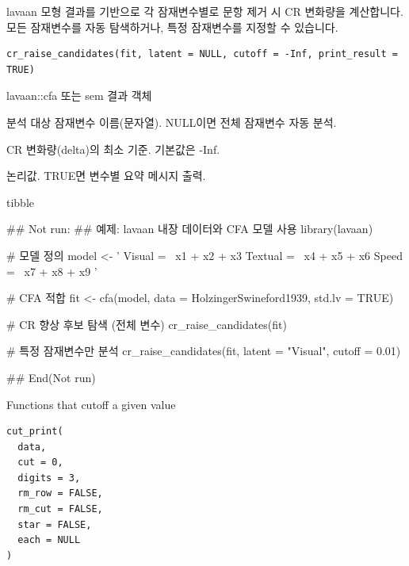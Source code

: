 \documentclass[a4paper]{book}
\begin{document}
%
\begin{Description}
lavaan 모형 결과를 기반으로 각 잠재변수별로 문항 제거 시 CR 변화량을 계산합니다.
모든 잠재변수를 자동 탐색하거나, 특정 잠재변수를 지정할 수 있습니다.
\end{Description}
%
\begin{Usage}
\begin{verbatim}
cr_raise_candidates(fit, latent = NULL, cutoff = -Inf, print_result = TRUE)
\end{verbatim}
\end{Usage}
%
\begin{Arguments}
\begin{ldescription}
\item[\code{fit}] lavaan::cfa 또는 sem 결과 객체

\item[\code{latent}] 분석 대상 잠재변수 이름(문자열). NULL이면 전체 잠재변수 자동 분석.

\item[\code{cutoff}] CR 변화량(delta)의 최소 기준. 기본값은 -Inf.

\item[\code{print\_result}] 논리값. TRUE면 변수별 요약 메시지 출력.
\end{ldescription}
\end{Arguments}
%
\begin{Value}
tibble
\end{Value}
%
\begin{Examples}
\begin{ExampleCode}
\#\# Not run: 
## 예제: lavaan 내장 데이터와 CFA 모델 사용
library(lavaan)

# 모델 정의
model <- '
  Visual  =~ x1 + x2 + x3
  Textual =~ x4 + x5 + x6
  Speed   =~ x7 + x8 + x9
'

# CFA 적합
fit <- cfa(model, data = HolzingerSwineford1939, std.lv = TRUE)

# CR 향상 후보 탐색 (전체 변수)
cr_raise_candidates(fit)

# 특정 잠재변수만 분석
cr_raise_candidates(fit, latent = "Visual", cutoff = 0.01)

## End(Not run)
\end{ExampleCode}
\end{Examples}
%
\begin{Description}
Functions that cutoff a given value
\end{Description}
%
\begin{Usage}
\begin{verbatim}
cut_print(
  data,
  cut = 0,
  digits = 3,
  rm_row = FALSE,
  rm_cut = FALSE,
  star = FALSE,
  each = NULL
)
\end{verbatim}
\end{Usage}
\end{document}
